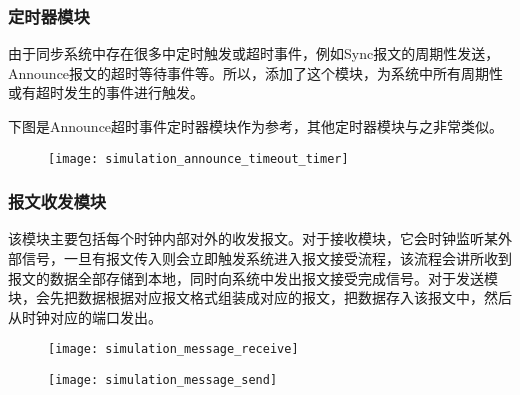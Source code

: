 \subsubsection{定时器模块}
由于同步系统中存在很多中定时触发或超时事件，例如Sync报文的周期性发送，Announce报文的超时等待事件等。所以，添加了这个模块，为系统中所有周期性或有超时发生的事件进行触发。

下图是Announce超时事件定时器模块作为参考，其他定时器模块与之非常类似。
\begin{figure}[!hbp]
  \centering
  \begin{minipage}[b]{1\textwidth}
    \captionstyle{\centering}
    \centering
    \texttt{[image: simulation\_announce\_timeout\_timer]}
  \end{minipage}     
\end{figure}

\subsubsection{报文收发模块}
该模块主要包括每个时钟内部对外的收发报文。对于接收模块，它会时钟监听某外部信号，一旦有报文传入则会立即触发系统进入报文接受流程，该流程会讲所收到报文的数据全部存储到本地，同时向系统中发出报文接受完成信号。对于发送模块，会先把数据根据对应报文格式组装成对应的报文，把数据存入该报文中，然后从时钟对应的端口发出。
\begin{figure}[!hbp]
  \centering
  \begin{minipage}[b]{1\textwidth}
    \captionstyle{\centering}
    \centering
    \texttt{[image: simulation\_message\_receive]}
  \end{minipage}     
\end{figure}
\begin{figure}[!hbp]
  \centering
  \begin{minipage}[b]{1\textwidth}
    \captionstyle{\centering}
    \centering
    \texttt{[image: simulation\_message\_send]}
  \end{minipage}     
\end{figure}
